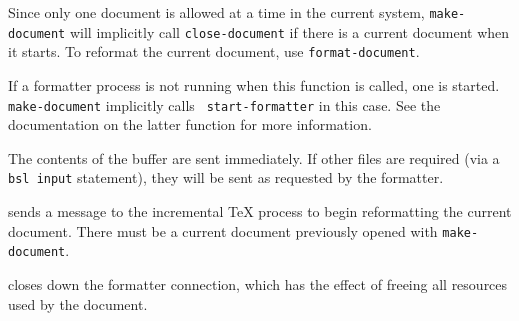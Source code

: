 Since only one document is allowed at a time in the current system,
{\tt make-document} will implicitly call {\tt close-document} if
there is a current document when it starts.  To reformat the current
document, use {\tt format-document}.

If a formatter process is not running when this function is called,
one is started.  {\tt make-document} implicitly calls {\tt
start-formatter} in this case.  See the documentation on the latter
function for more information.

The contents of the buffer are sent immediately.  If other files are
required (via a {\tt \\bsl input} statement), they will be sent as
requested by the formatter.

%
sends a message to the incremental {\TeX} process to begin
reformatting the current document.  There must be a current document
previously opened with {\tt make-document}.

%
closes down the formatter connection, which has the effect of freeing
all resources used by the document.
